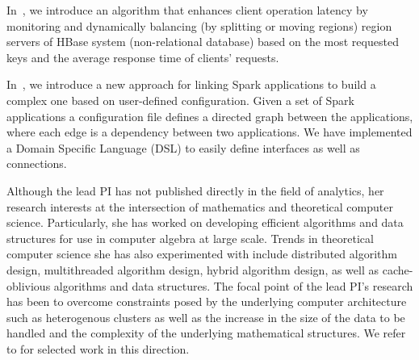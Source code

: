 In~\cite{hbase-dynamique}, we introduce an algorithm that enhances client operation latency by monitoring and dynamically balancing (by splitting or moving regions) region servers of HBase system (non-relational database) based on the most requested keys and the average response time of clients' requests.
%

In~\cite{spark-cbs}, we introduce a new approach for linking Spark applications to build a complex one based on user-defined configuration. Given a set of Spark applications a configuration file defines a directed graph between the applications, where
each edge is a dependency between two applications. We have implemented a Domain Specific
Language (DSL) to easily define interfaces as well as connections. 

Although the lead PI has not published directly in the field of analytics, her research interests at the intersection of mathematics and theoretical computer science. Particularly, she has worked on developing efficient algorithms and data structures for use in computer algebra at large scale. Trends in theoretical computer science she has also experimented with include distributed algorithm design, multithreaded algorithm design, hybrid algorithm design, as well as cache-oblivious algorithms and data structures. The focal point of the lead PI's research has been to overcome constraints posed by the underlying computer architecture such as heterogenous clusters as well as the increase in the size of the data to be handled and the complexity of the underlying mathematical structures. We refer to \cite{S12,S14,S15} for selected work in this direction.
 


